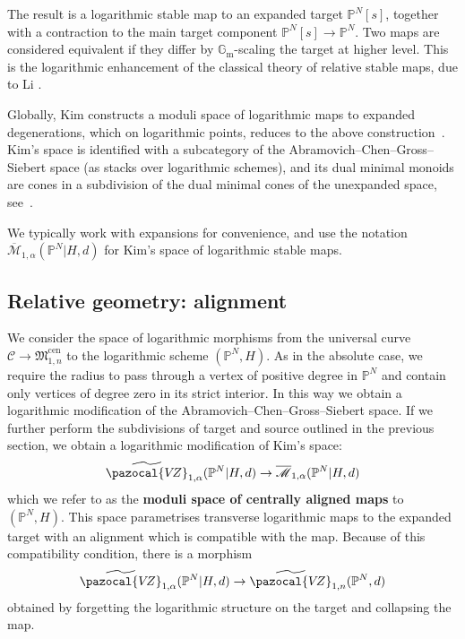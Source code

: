 \documentclass[11pt]{amsart}
\newcommand{\PP}{\mathbb P}
\newcommand{\VZ}{\pazocal{V\!Z}}
\renewcommand{\to}{\rightarrow}
\newcommand{\Gm}{\mathbb{G}_{\text{m}}}
\newcommand{\Mcal}{\mathcal{M}}
\newcommand{\ol}[1]{\overline{#1}}
\theoremstyle{definition}
\theoremstyle{definition}
\begin{document}
The result is a logarithmic stable map to an expanded target $\mathbb P^N[s]$, together with a contraction to the main target component $\mathbb P^N[s]\to\mathbb P^N$. Two maps are considered equivalent if they differ by $\Gm$-scaling the target at higher level. This is the logarithmic enhancement of the classical theory of relative stable maps, due to Li \cite{Li1,Li2}.

Globally, Kim constructs a moduli space of logarithmic maps to expanded degenerations, which on logarithmic points, reduces to the above construction~\cite{KimLog}. Kim's space is identified with a subcategory of the Abramovich--Chen--Gross--Siebert space (as stacks over logarithmic schemes), and its dual minimal monoids are cones in a subdivision of the dual minimal cones of the unexpanded space, see~\cite[\S~2]{R19}. 

We typically work with expansions for convenience, and use the notation
$\ol\Mcal_{1,\alpha}(\PP^N|H,d)$
for Kim's space of logarithmic stable maps.

\subsection{Relative geometry: alignment} We consider the space of logarithmic morphisms from the universal curve $\mathcal{C} \to \mathfrak{M}_{1,n}^{\mathrm{cen}}$ to the logarithmic scheme $(\PP^N,H)$. As in the absolute case, we require the radius to pass through a vertex of positive degree in $\PP^N$ and contain only vertices of degree zero in its strict interior. In this way we obtain a logarithmic modification of the Abramovich--Chen--Gross--Siebert space. If we further perform the subdivisions of target and source outlined in the previous section, we obtain a logarithmic modification of Kim's space:
\begin{equation*} \widetilde\VZ_{1,\alpha}(\PP^N|H,d) \to \ol\Mcal_{1,\alpha}(\PP^N|H,d)\end{equation*}
which we refer to as the \textbf{moduli space of centrally aligned maps} to $(\PP^N,H)$. This space parametrises transverse logarithmic maps to the expanded target with an alignment which is compatible with the map. Because of this compatibility condition, there is a morphism
\begin{equation*} \widetilde\VZ_{1,\alpha}(\PP^N|H,d) \to \widetilde\VZ_{1,n}(\PP^N,d)\end{equation*}
obtained by forgetting the logarithmic structure on the target and collapsing the map.
\end{document}
